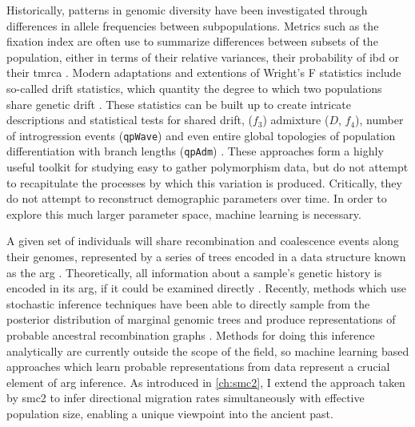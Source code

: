Historically, patterns in genomic diversity have been investigated through differences in allele frequencies between subpopulations. 
Metrics such as the fixation index are often use to summarize differences between subsets of the population, either in terms of their relative variances, their probability of \gls{ibd} or their \gls{tmrca} \cite{Holsinger2009}. 
Modern adaptations and extentions of Wright's F statistics include so-called drift statistics, which quantity the degree to which two populations share genetic drift \cite{Patterson2012}. These statistics can be built up to create intricate descriptions and statistical tests for shared drift, ($f_3$) admixture ($D$, $f_4$), number of introgression events ({\tt qpWave}) and even entire global topologies of population differentiation with branch lengths ({\tt qpAdm}) \cite{Petr2019}. These approaches form a highly useful toolkit for studying easy to gather polymorphism data, but do not attempt to recapitulate the processes by which this variation is produced. Critically, they do not attempt to reconstruct demographic parameters over time. In order to explore this much larger parameter space, machine learning is necessary. 

A given set of individuals will share recombination and coalescence events along their genomes, represented by a series of trees encoded in a data structure known as the \gls{arg} \cite{Rasmussen2014}. Theoretically, all information about a sample's genetic history is encoded in its \gls{arg}, if it could be examined directly \cite{Speidel2019}. Recently, methods which use stochastic inference techniques have been able to directly sample from the posterior distribution of marginal genomic trees and produce representations of probable ancestral recombination graphs \cite{Speidel2019, Kelleher2019, Rasmussen2014}. Methods for doing this inference analytically are currently outside the scope of the field, so machine learning based approaches which learn probable representations from data represent a crucial element of \gls{arg} inference. As introduced in \autoref{ch:smc2}, I extend the approach taken by \gls{smc2} to infer directional migration rates simultaneously with effective population size, enabling a unique viewpoint into the ancient past.


